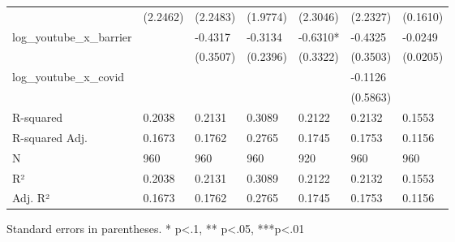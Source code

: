 \begin{table}
\begin{center}
\begin{tabular}{lllllll}
                         & (2.2462)   & (2.2483)   & (1.9774)   & (2.3046)   & (2.2327)   & (0.1610)    \\
log\_youtube\_x\_barrier &            & -0.4317    & -0.3134    & -0.6310*   & -0.4325    & -0.0249     \\
                         &            & (0.3507)   & (0.2396)   & (0.3322)   & (0.3503)   & (0.0205)    \\
log\_youtube\_x\_covid   &            &            &            &            & -0.1126    &             \\
                         &            &            &            &            & (0.5863)   &             \\
R-squared                & 0.2038     & 0.2131     & 0.3089     & 0.2122     & 0.2132     & 0.1553      \\
R-squared Adj.           & 0.1673     & 0.1762     & 0.2765     & 0.1745     & 0.1753     & 0.1156      \\
N                        & 960        & 960        & 960        & 920        & 960        & 960         \\
R²                       & 0.2038     & 0.2131     & 0.3089     & 0.2122     & 0.2132     & 0.1553      \\
Adj. R²                  & 0.1673     & 0.1762     & 0.2765     & 0.1745     & 0.1753     & 0.1156      \\
\hline
\end{tabular}
\end{center}
\end{table}
\bigskip
Standard errors in parentheses. \newline 
* p<.1, ** p<.05, ***p<.01